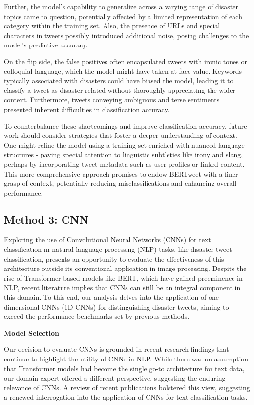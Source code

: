 \documentclass[10pt,table]{article}
\begin{document}
Further, the model's capability to generalize across a varying range of disaster topics came to question, potentially affected by a limited representation of each category within the training set. Also, the presence of URLs and special characters in tweets possibly introduced additional noise, posing challenges to the model's predictive accuracy.

On the flip side, the false positives often encapsulated tweets with ironic tones or colloquial language, which the model might have taken at face value. Keywords typically associated with disasters could have biased the model, leading it to classify a tweet as disaster-related without thoroughly appreciating the wider context. Furthermore, tweets conveying ambiguous and terse sentiments presented inherent difficulties in classification accuracy.

To counterbalance these shortcomings and improve classification accuracy, future work should consider strategies that foster a deeper understanding of context. One might refine the model using a training set enriched with nuanced language structures - paying special attention to linguistic subtleties like irony and slang, perhaps by incorporating tweet metadata such as user profiles or linked content. This more comprehensive approach promises to endow BERTweet with a finer grasp of context, potentially reducing misclassifications and enhancing overall performance.

\subsection{Method 3: CNN}
Exploring the use of Convolutional Neural Networks (CNNs) for text classification in natural language processing (NLP) tasks, like disaster tweet classification, presents an opportunity to evaluate the effectiveness of this architecture outside its conventional application in image processing. Despite the rise of Transformer-based models like BERT, which have gained preeminence in NLP, recent literature implies that CNNs can still be an integral component in this domain. To this end, our analysis delves into the application of one-dimensional CNNs (1D-CNNs) for distinguishing disaster tweets, aiming to exceed the performance benchmarks set by previous methods.


\textbf{Model Selection}

Our decision to evaluate CNNs is grounded in recent research findings that continue to highlight the utility of CNNs in NLP. While there was an assumption that Transformer models had become the single go-to architecture for text data, our domain expert offered a different perspective, suggesting the enduring relevance of CNNs. A review of recent publications bolstered this view, suggesting a renewed interrogation into the application of CNNs for text classification tasks.
\end{document}
